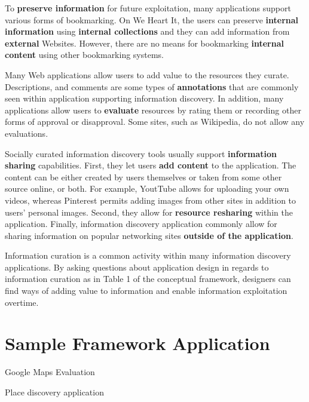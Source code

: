 \documentclass{casconpaper}
\begin{document}
{To \textbf{preserve information} for future exploitation, many applications support various forms of bookmarking. On We Heart It, the users can preserve \textbf{internal  information} using \textbf{internal collections} and they can add information from \textbf{external} Websites. However, there are no means for bookmarking \textbf{internal content} using other bookmarking systems.  

Many Web applications allow users to add value to the resources they curate. Descriptions, and comments are some types of \textbf{annotations} that are commonly seen within application supporting information discovery. In addition, many applications allow users to \textbf{evaluate} resources by rating them or recording other forms of approval or disapproval. Some sites, such as Wikipedia, do not allow any evaluations.  

Socially curated information discovery tools usually support \textbf{information sharing} capabilities. First, they let users \textbf{add content} to the application. The content can be either created by users themselves or taken from some other source online, or both. For example, YoutTube allows for uploading your own videos, whereas Pinterest permits adding images from other sites in addition to users' personal images. Second, they allow for \textbf{resource resharing} within the application. Finally, information discovery application commonly allow for sharing information on popular networking sites \textbf{outside of the application}. 

Information curation is a common activity within many information discovery applications. By asking questions about application design in regards to information curation as in Table 1 of the conceptual framework, designers can find ways of adding value to information and enable information exploitation overtime.  
 
} %

{\section{Sample Framework Application}
Google Maps Evaluation

Place discovery application
} %
\end{document}
